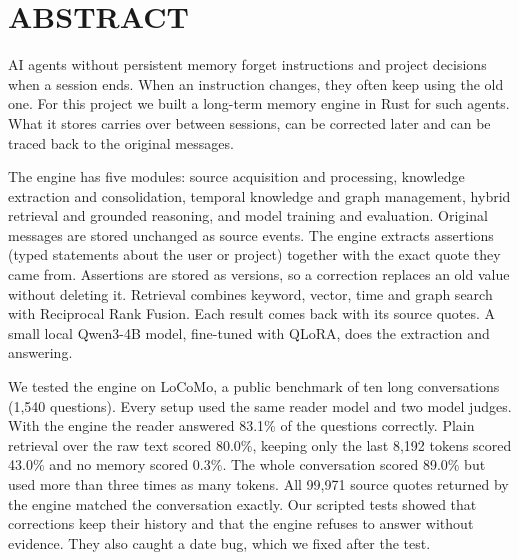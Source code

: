 \chapter*{\uppercase{ABSTRACT}}
AI agents without persistent memory forget instructions and project decisions when a
session ends. When an instruction changes, they often keep using the old one. For this
project we built a long-term memory engine in Rust for such agents. What it stores
carries over between sessions, can be corrected later and can be traced back to the
original messages.

The engine has five modules: source acquisition and processing, knowledge extraction
and consolidation, temporal knowledge and graph management, hybrid retrieval and
grounded reasoning, and model training and evaluation. Original messages are stored
unchanged as source events. The engine extracts assertions (typed statements about the
user or project) together with the exact quote they came from. Assertions are stored as
versions, so a correction replaces an old value without deleting it. Retrieval combines
keyword, vector, time and graph search with Reciprocal Rank Fusion. Each result comes
back with its source quotes. A small local Qwen3-4B model, fine-tuned with QLoRA, does
the extraction and answering.

We tested the engine on LoCoMo, a public benchmark of ten long conversations (1,540
questions). Every setup used the same reader model and two model judges. With the engine
the reader answered 83.1\% of the questions correctly. Plain retrieval over the raw text
scored 80.0\%, keeping only the last 8,192 tokens scored 43.0\% and no memory scored
0.3\%. The whole conversation scored 89.0\% but used more than three times as many
tokens. All 99,971 source quotes returned by the engine matched the conversation exactly.
Our scripted tests showed that corrections keep their history and that the engine refuses
to answer without evidence. They also caught a date bug, which we fixed after the test.
